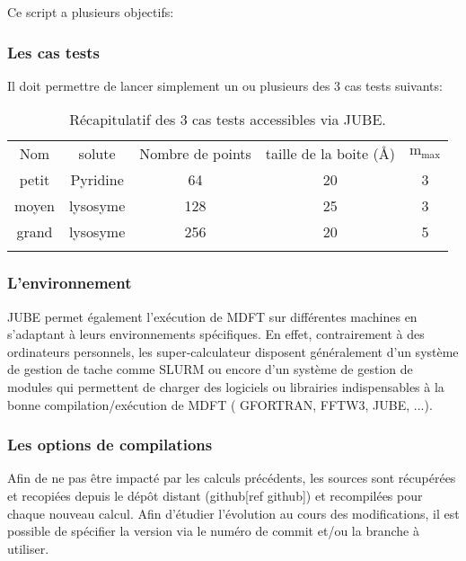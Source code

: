 Ce script a plusieurs objectifs:


\subsubsection{ Les cas tests }
Il doit permettre de lancer simplement un ou plusieurs des 3 cas tests suivants:

\begin{table}[H]
  \begin{center}
    \begin{tabular}{c c c c c }
      \hline & \\[-1em]\hline
      Nom & solute & Nombre de points & taille de la boite (\AA) & $\mathrm{m}_\mathrm{max}$  \\
      \hline
      petit & Pyridine & 64 & 20 & 3  \\
      moyen & lysosyme & 128 & 25 & 3  \\
      grand & lysosyme & 256 & 20 & 5  \\
      \hline & \\[-1em]\hline%
    \end{tabular}
  \end{center}
  \caption{Récapitulatif des 3 cas tests accessibles via JUBE.}
  \label{tab:JUBE_bench_cases}  
\end{table}


\subsubsection{ L'environnement }
JUBE permet également l’exécution de MDFT sur différentes machines en s'adaptant à leurs environnements spécifiques. En effet, contrairement à des ordinateurs personnels, les super-calculateur disposent généralement d'un système de gestion de tache comme SLURM ou encore d'un système de gestion de modules qui permettent de charger des logiciels ou librairies indispensables à la bonne compilation/exécution de MDFT ( GFORTRAN, FFTW3, JUBE, ...).


\subsubsection{ Les options de compilations }
Afin de ne pas être impacté par les calculs précédents, les sources sont récupérées et recopiées depuis le dépôt distant (github[ref github]) et recompilées pour chaque nouveau calcul. Afin d'étudier l'évolution au cours des modifications, il est possible de spécifier la version via le numéro de commit et/ou la branche à utiliser.

